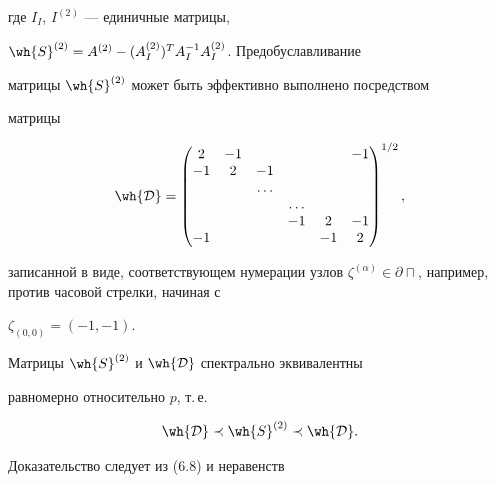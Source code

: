 где $I_I$, $ I^{(2)}$ --- единичные матрицы, 


$\wh{S}^{(2)} = A^{(2)}-(A^{(2)}_I)^T A^{-1}_I A^{(2)}_I$. Предобуславливание 


матрицы $\wh{S}^{(2)}$ может быть эффективно выполнено посредством 


матрицы


\begin{equation}\label{eq6.17}


\wh{{\cal D}} =


\begin{pmatrix}


2 & -1 & & & & -1\\


-1 & 2 & -1\\


& & \dotsc\\


& & & \dotsc\\


& & & -1 & 2 & -1\\


-1 & & & & -1 & 2


\end{pmatrix}


^{1/2}, 


\end{equation}


записанной в виде, соответствующем нумерации узлов $\zeta^{(\alpha)} \in 


\partial\sqcap$, например, против часовой стрелки, начиная с 


$\zeta_{(0,0)} = (-1,-1)$.





\begin{cors}\label{cor6.1}


Матрицы $\wh{S}^{(2)}$ и $\wh{{\cal D}}$ спектрально эквивалентны 


равномерно относительно $p$, т.\,е.


\begin{equation}\label{eq6.18}


\wh{{\cal D}} \prec \wh{S}^{(2)} \prec \wh{{\cal D}}.


\end{equation}


\end{cors}





Доказательство следует из (6.8) и неравенств 


